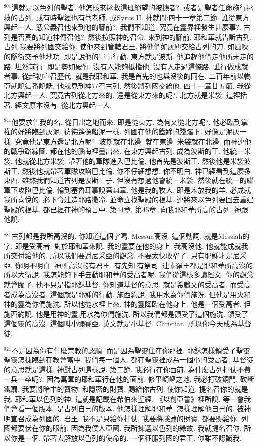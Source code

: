 \documentclass{book}
\begin{document}
$^{801}$這就是以色列的聖者.
他怎樣來拯救這班絕望的被擄者?.
或者是聖者任命施行拯救的古列.
或有時聖經也有蔡老師.
或Syrus II.
神就問:四十一章第二節.
誰從東方興起一人.
憑公義召他來到他的腳前?.
我們不知道.
究竟在靈界裡發生甚麼事?.
古列是否真的知道神傳召他?.
然後按照神的召命.
來到神的腳前.
耶和華就告訴古列.
古列,我要將列國交給你.
使他來到管轄君王.
將他們如灰塵交給古列的刀.
如風吹的隧街交予他地功.
即是說他的軍事行動.
東方就是波斯.
他追趕他們走他所未走的路.
坦然前行.
即是勢如破竹.
沒有人能夠抵擋他.
沒有人走過這條路.
誰行做成就者事.
從起初宣召歷代.
就是我耶和華.
我是首先的也與沒後的同在.
二百年前以暢亞就說這番說話.
他就見到神宣召古列.
然後將列國交給他.
四十一章廿五節.
我從北方興起一人.
究竟古列從北方來的.
還是從東方來的呢?.
北方就是米袋.
這裡括著.
經文原本沒有.
從北方興起一人.

$^{841}$他要求告我的名.
從日出之地而來.
即是從東方.
為何又從北方呢?.
他必臨到掌權的好將臨到灰泥.
彷彿遙像船泥一樣.
列國在他的鐵蹄的踐踏下.
好像是泥灰一樣.
究竟他是東方還是北方呢?.
波斯就在北邊.
就在東邊.
米袋就在北邊.
而神連他的戰爭路線圖.
都在他的腦海裡畫出來.
在東方興起古列.
成為波斯的王.
他統一米袋.
他就從北方米袋.
帶著他的軍隊進入巴比倫.
他首先是波斯王.
然後他是米袋波斯王.
然後他就帶著軍隊攻陷巴比倫.
你不仔細想想.
你不明白.
神已經看到這麼多東西.
雖然我們知道古列是波斯王子.
但沒有想過他會統一米袋.
然後就在統一的聯軍下攻陷巴比倫.
輪到塞魯耳事說第44章.
他是我的牧人.
即是木放我的羊.
必成就我所喜悅的.
必下令建造耶路撒冷.
並命立找聖殿的根基.
連將來以色列要回去重建聖殿的根基.
都已經在神的預言中.
第44章.
第45章.
向我耶和華所高的古列.
神跟他說.

$^{881}$古列都是我所高沒的.
你知道這個字嗎.
Messua高沒.
這個動詞.
就是Messiah的字.
即是受高者.
對於耶和華來說.
我的靈要在他的身上.
我高沒他.
他就能成就我所交付給他的.
所以我們要對尼采亞的觀念.
不要太快收窄了.
只有耶穌才是尼采亞.
你明不明白.
神所高沒的有君王.
有先知,有祭司.
連素羅王都是耶和華所高沒的.
所以大衛說.
我怎能夠下手去動耶和華的受高者呢.
我們從這樣多讀經文.
你的觀念就會闊了.
他不只是指耶穌基督.
你知道基督的意思.
就是希臘文的受高者.
而受高者成為高沒者.
這個就是耶穌的行動.
施西約說.
我用水為你們施洗.
但他是用火和神的靈為你們施洗.
所以他從水裡上來.
神的靈降臨在他身上.
他是一個受高者.
但施西約說.
他是用神的靈,用水為你們施洗.
所以我們都是領受了這個施洗.
領受了這個靈的高沒.
這個叫小彌賽亞.
英文就是小基督.
Christian.
所以你今天成為基督徒.

$^{921}$不是因為你有什麼宗教的認順.
而是因為聖靈住在你那裡.
耶穌怎樣領受了聖靈.
聖靈怎樣臨到在教會當中.
我們每一個人.
都在聖靈裡成為一個小的受高者.
基督徒的意思就是這樣.
神對古列這樣說.
第二節.
我必行在你面前.
為什麼古列打仗不費一兵一卒呢?.
因為萬軍的耶和華行在他的面前.
修平崎嶇之地.
我必打破銅門.
砍斷鐵扇.
我要將暗中的寶物.
和隱密的財寶.
賜給你古列.
使你知道.
提名召你的就是我.
耶和華以色列的神.
這就是記載在希伯來聖經.
《以創亞書》裡所說.
等一會我們會看一個版本.
是古列自己的版本.
他怎樣理解耶和華.
怎樣理解他自己的.
被神明宣召成為列國的.
君王.
我不是只給你打仗.
我要將隱藏的財寶.
都要賜給你.
列國都要伏在你的眼前.
因為我僕人亞國.
我所揀選以色列的緣故.
我就提名召你.
所以你是一個.
帶著去解放以色列的使命的.
一個征服列國的君王.
你雖不認識我.
\end{document}
